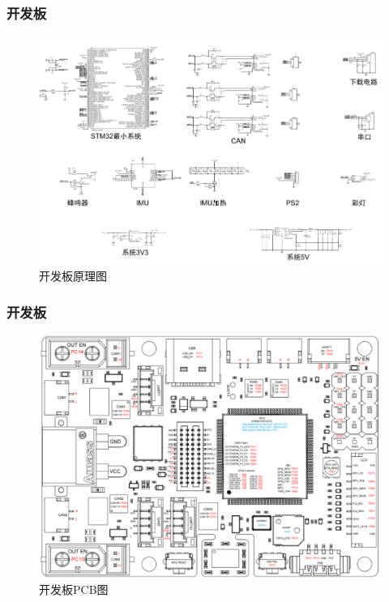 \documentclass{beamer}
\begin{document}
	\begin{frame}
		\frametitle{开发板}
		
	\begin{figure}
		\centering
		\includegraphics[width=0.8\linewidth]{img/chapter4/DMH7}
		\captionsetup{font=scriptsize}
		\caption{开发板原理图}
	\end{figure}
	
	\end{frame}
	
	\begin{frame}
		\frametitle{开发板}
		
		\begin{figure}
			\centering
			\includegraphics[width=0.8\linewidth]{img/chapter4/DMH7PCB}
			\captionsetup{font=scriptsize}
			\caption{开发板PCB图}
		\end{figure}
		
	\end{frame}
	
\end{document}
